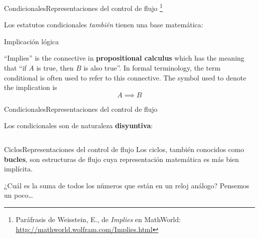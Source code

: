 \documentclass[spanish, c]{beamer}
\newcommand\blfootnote[1]{%
\begingroup
\renewcommand\thefootnote{}\footnote{#1}%
\addtocounter{footnote}{-1}%
\endgroup
}
\begin{document}
\begin{frame}{Condicionales}{Representaciones del control de flujo}
    \blfootnote{Paráfrasis de Weisstein, E., de \textit{Implies} en MathWorld: \url{http://mathworld.wolfram.com/Implies.html}}

    Los estatutos condicionales \textit{también} tienen una base matemática: \pause

    \bigskip

    \begin{block}{Implicación lógica}
        \begin{displayquote}
            ``Implies'' is the connective in \textbf{propositional calculus} which has the meaning that ``if $A$ is true, then $B$ is also true''.
            In formal terminology, the term conditional is often used to refer to this connective. The symbol used to denote the implication is $$A \implies B$$
        \end{displayquote}
    \end{block}
\end{frame}

\begin{frame}{Condicionales}{Representaciones del control de flujo}

    Los condicionales son de naturaleza \textbf{disyuntiva}:

    \bigskip

    \begin{columns}
        \begin{column}{0.9\linewidth}
            
        \end{column}
    \end{columns}

\end{frame}

\begin{frame}{Ciclos}{Representaciones del control de flujo}
    Los \alert{ciclos}, también conocidos como \textbf{bucles}, son estructuras de flujo cuya representación matemática es más bien implícita. \pause

    \bigskip

    ¿Cuál es la suma de todos los números que están en un reloj análogo? \pause Pensemos un poco\dots
\end{frame}
\end{document}
